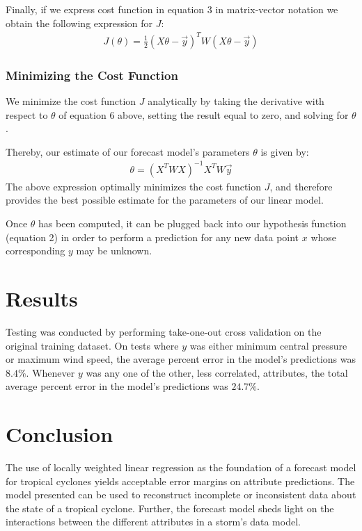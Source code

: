 \documentclass[letterpaper,twocolumn,10pt]{article}
\begin{document}
Finally, if we express cost function in equation 3 in matrix-vector notation we
obtain the following expression for $J$:
\begin{align}
  J(\theta) = \frac{1}{2}(X\theta - \vec{y})^T W(X\theta - \vec{y})
\end{align}

\subsubsection{Minimizing the Cost Function}

We minimize the cost function $J$ analytically by taking the derivative with
respect to $\theta$ of equation 6 above, setting the result equal to zero, and
solving for $\theta$.

Thereby, our estimate of our forecast model's parameters $\theta$ is given by:
\begin{align}
  \theta = (X^T W X)^{-1} X^T W \vec{y}
\end{align}
The above expression optimally minimizes the cost function $J$, and therefore
provides the best possible estimate for the parameters of our linear model.

Once $\theta$ has been computed, it can be plugged back into our hypothesis
function (equation 2) in order to perform a prediction for any new data point
$x$ whose corresponding $y$ may be unknown.

\section{Results}

Testing was conducted by performing take-one-out cross validation on the
original training dataset. On tests where $y$ was either minimum central
pressure or maximum wind speed, the average percent error in the model's 
predictions was $8.4\%$. Whenever $y$ was any one of the other, less correlated,
attributes, the total average percent error in the model's predictions was 
$24.7\%$.


\section{Conclusion}
The use of locally weighted linear regression as the foundation of a forecast
model for tropical cyclones yields acceptable error margins on attribute
predictions. The model presented can be used to reconstruct incomplete or 
inconsistent data about the state of a tropical cyclone. Further, the forecast
model sheds light on the interactions between the different attributes in
a storm's data model.





\end{document}
